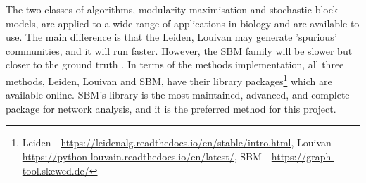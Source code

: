 The two classes of algorithms, modularity maximisation and stochastic block models, are applied to a wide range of applications in biology and are available to use. The main difference is that the Leiden, Louivan may generate 'spurious' communities, and it will run faster. However, the SBM family will be slower but closer to the ground truth \citep{Peixoto2023-se}. In terms of the methods implementation, all three methods, Leiden, Louivan and SBM, have their library packages\footnote{Leiden - \url{https://leidenalg.readthedocs.io/en/stable/intro.html}, Louivan - \url{https://python-louvain.readthedocs.io/en/latest/}, SBM - \url{https://graph-tool.skewed.de/}} which are available online. SBM's library is the most maintained, advanced, and complete package for network analysis, and it is the preferred method for this project.






